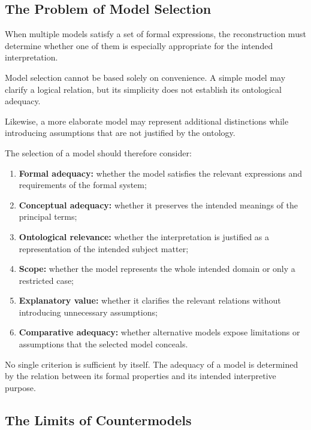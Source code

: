 \subsection{The Problem of Model Selection}

When multiple models satisfy a set of formal expressions,
the reconstruction must determine whether one of
them is especially appropriate for the intended
interpretation.

Model selection cannot be based solely on convenience.
A simple model may clarify a logical relation, but
its simplicity does not establish its ontological
adequacy.

Likewise, a more elaborate model may represent
additional distinctions while introducing assumptions
that are not justified by the ontology.

The selection of a model should therefore consider:

\begin{enumerate}
    \item \textbf{Formal adequacy:} whether the model
    satisfies the relevant expressions and requirements
    of the formal system;

    \item \textbf{Conceptual adequacy:} whether it preserves
    the intended meanings of the principal terms;

    \item \textbf{Ontological relevance:} whether the
    interpretation is justified as a representation
    of the intended subject matter;

    \item \textbf{Scope:} whether the model represents
    the whole intended domain or only a restricted
    case;

    \item \textbf{Explanatory value:} whether it clarifies
    the relevant relations without introducing
    unnecessary assumptions;

    \item \textbf{Comparative adequacy:} whether alternative
    models expose limitations or assumptions that
    the selected model conceals.
\end{enumerate}

No single criterion is sufficient by itself.
The adequacy of a model is determined by the relation
between its formal properties and its intended
interpretive purpose.

\subsection{The Limits of Countermodels}

